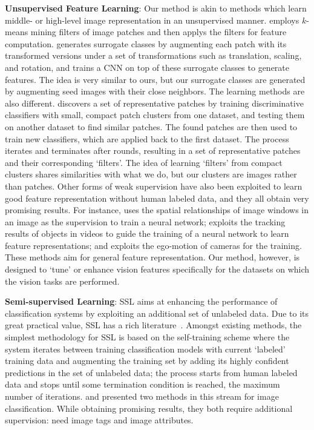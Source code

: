 \textbf{Unsupervised Feature Learning}: Our method is akin to methods which learn middle- or high-level image
representation in an unsupervised manner. \citep{stl-10} employs
$k$-means mining filters of image patches and then applys the filters
for feature computation. \citep{cnnfet14} generates surrogate classes
by augmenting each patch with its transformed versions under a set of
transformations such as translation, scaling, and rotation, and trains
a CNN on top of these surrogate classes to generate features. The idea
is very similar to ours, but our surrogate classes are generated by
augmenting seed images with their close neighbors. The learning
methods are also different. \citep{mid-level:patches} discovers a set
of representative patches by training discriminative classifiers with
small, compact patch clusters from one dataset, and testing them on
another dataset to find similar patches. The found patches are then
used to train new classifiers, which are applied back to the first
dataset. The process iterates and terminates after rounds, resulting
in a set of representative patches and their corresponding
`filters'. The idea of learning `filters' from compact clusters shares
similarities with what we do, but our clusters are images rather than
patches. Other forms of weak supervision have also been exploited to learn good 
feature representation without human labeled data, and they all obtain very promising results. 
For instance, \citep{feature:context} uses the spatial relationships of 
image windows in an image as the supervision to train a neural network; \citep{feature:video} exploits 
the tracking results of objects in videos to guide the training of a neural network to learn 
feature representations; and \citep{learning:by:moving} exploits the ego-motion of cameras for the training.
These methods aim for general feature representation. Our method, however, is designed to 
`tune' or enhance vision features specifically for the datasets on which the vision tasks are performed.  

\textbf{Semi-supervised Learning}: SSL aims at enhancing the
performance of classification systems by exploiting an additional set of
unlabeled data. Due to its great practical value, SSL has a rich
literature~\citep{book06:ssl, Zhu:ISL:2009}. Amongst existing methods,
the simplest methodology for SSL is based on the self-training scheme
\citep{co-training:98} where the system iterates between training
classification models with current `labeled' training data and augmenting
the training set by adding its highly confident predictions in the set
of unlabeled data; the process starts from human labeled data and
stops until some termination condition is reached, \eg the maximum
number of iterations.  \citep{Guillaumin:cvpr:10} and \citep{Semi:eccv12} presented two methods in this stream for image classification. While
obtaining promising results, they both require additional supervision:
\citep{Guillaumin:cvpr:10} need image tags and \citep{Semi:eccv12}
image attributes.

